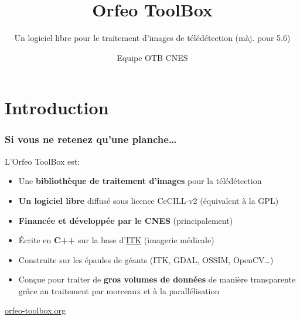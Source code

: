 \documentclass[8pt]{beamer}
\title{Orfeo ToolBox}
\subtitle{Un logiciel libre pour le traitement d'images de télédétection (màj.  pour 5.6)}
\author{Equipe OTB CNES}%
\date{}
\begin{document}
\begin{frame}
\titlepage
\end{frame}

\section*{Introduction}

\begin{frame}
\frametitle{Si vous ne retenez qu'une planche\ldots}
\begin{block}{L'Orfeo ToolBox est:}
\begin{itemize}
\item Une \textbf{bibliothèque de traitement d'images} pour la télédétection
\item \textbf{Un logiciel libre} diffusé sous licence CeCILL-v2 (équivalent à la GPL)
\item \textbf{Financée et développée par le CNES} (principalement)
\item Écrite en \textbf{C++} sur la base d'\href{www.itk.org}{ITK} (imagerie médicale)
\item Construite sur les épaules de géants (ITK, GDAL, OSSIM, OpenCV\ldots)
\item Conçue pour traiter de \textbf{gros volumes de données} de manière transparente grâce au traitement par morceaux et à la parallélisation
\end{itemize}
\end{block}

\begin{center}
{\huge\textcolor{red}{\href{http://www.orfeo-toolbox.org}{orfeo-toolbox.org}}}
\end{center}

\end{frame}
\end{document}
